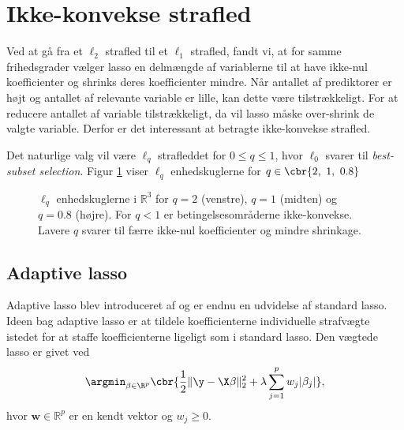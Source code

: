 \section{Ikke-konvekse strafled}
Ved at gå fra et \(\ell_2\) strafled til et \(\ell_1\) strafled, fandt vi, at for samme frihedsgrader vælger lasso en delmængde af variablerne til at have ikke-nul koefficienter og shrinks deres koefficienter mindre.
Når antallet af prediktorer er højt og antallet af relevante variable er lille, kan dette være tilstrækkeligt.
For at reducere antallet af variable tilstrækkeligt, da vil lasso måske over-shrink de valgte variable.
Derfor er det interessant at betragte ikke-konvekse strafled.

Det naturlige valg vil være \(\ell_q\) strafleddet for \(0 \leq q \leq 1\), hvor \(\ell_0\) svarer til \textit{best-subset selection}.
Figur \ref{fig:nonconvex_penalties} viser \(\ell_q\) enhedskuglerne for \(q \in \cbr{2, \ 1, \ 0.8}\)

%
\begin{figure}[H]
\centering
\caption{\(\ell_q\) enhedskuglerne i \(\mathbb{R}^3\) for \(q=2\) (venstre), \(q=1\) (midten) og \(q=0.8\) (højre). 
For \(q<1\) er betingelsesområderne ikke-konvekse. Lavere \(q\) svarer til færre ikke-nul koefficienter og mindre shrinkage.}
\label{fig:nonconvex_penalties}
\end{figure}
%


\subsection{Adaptive lasso}
Adaptive lasso blev introduceret af \citep{adaptive_lasso} og er endnu en udvidelse af standard lasso.
Ideen bag adaptive lasso er at tildele koefficienterne individuelle strafvægte istedet for at staffe koefficienterne ligeligt som i standard lasso.
Den vægtede lasso er givet ved
\begin{align*}
\argmin_{\beta \in \R^p} \cbr{\frac{1}{2} \Vert \y - \X \beta \Vert_2^2 + \lambda \sum_{j=1}^p w_j \vert \beta_j \vert},
\end{align*}
hvor \(\mathbf{w} \in \mathbb{R}^p\) er en kendt vektor og \(w_j \geq 0\).

